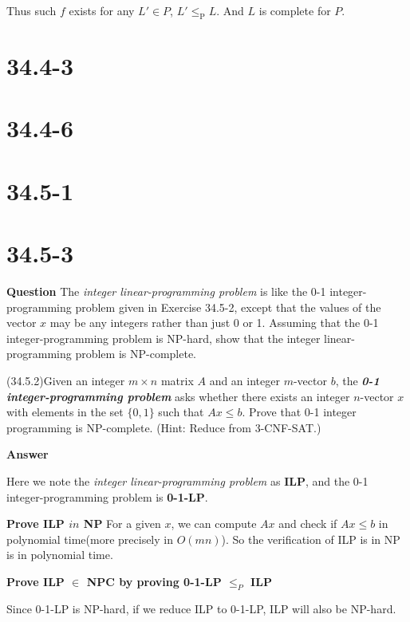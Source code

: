 \documentclass[12pt]{article}
\begin{document}
Thus such $f$ exists for any $L' \in P$, $L' \le_\text{P} L$. And $L$ is complete for $P$.

\section{34.4-3}

\section{34.4-6}

\section{34.5-1}

\section{34.5-3}
\textbf{Question}
The \textit{integer linear-programming problem} is like the 0-1 integer-programming problem given in Exercise 34.5-2, except that the values of the vector $x$ may be any integers rather than just 0 or 1. Assuming that the 0-1 integer-programming problem is NP-hard, show that the integer linear-programming problem is NP-complete.

(34.5.2)Given an integer $m \times n$ matrix $A$ and an integer $m$-vector $b$, the \textbf{\textit{0-1 integer-programming problem}} asks whether there exists an integer $n$-vector $x$ with elements in the set $\{0, 1\}$ such that $Ax \le b$. Prove that 0-1 integer programming is NP-complete. (Hint: Reduce from 3-CNF-SAT.)

\textbf{Answer}

Here we note the \textit{integer linear-programming problem} as \textbf{ILP}, and the 0-1 integer-programming problem is \textbf{0-1-LP}.



\textbf{Prove ILP $in$ NP}
For a given $x$, we can compute $Ax$ and check if $Ax \leq b$ in polynomial time(more precisely in $O(mn)$). So the verification of ILP is in NP is in polynomial time.

\textbf{Prove ILP $\in$ NPC by proving 0-1-LP $\leq_{P}$ ILP}

Since 0-1-LP is NP-hard, if we reduce ILP to 0-1-LP, ILP will also be NP-hard. 
\end{document}
